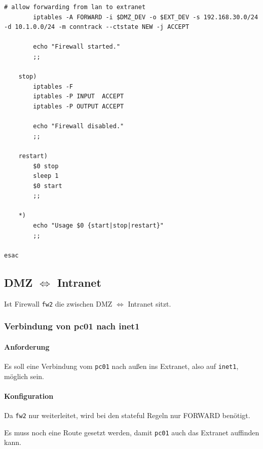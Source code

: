 \begin{lstlisting}[label=lst:masq,caption={Masquerading.}]
        # allow forwarding from lan to extranet
        iptables -A FORWARD -i $DMZ_DEV -o $EXT_DEV -s 192.168.30.0/24 -d 10.1.0.0/24 -m conntrack --ctstate NEW -j ACCEPT

        echo "Firewall started."
        ;;

    stop)
        iptables -F
        iptables -P INPUT  ACCEPT
        iptables -P OUTPUT ACCEPT

        echo "Firewall disabled."
        ;;

    restart)
        $0 stop
        sleep 1
        $0 start
        ;;

    *)
        echo "Usage $0 {start|stop|restart}"
        ;;

esac
\end{lstlisting}


\subsection{DMZ $\Longleftrightarrow$ Intranet}

Ist Firewall {\tt fw2} die zwischen DMZ $\Longleftrightarrow$ Intranet sitzt.

\subsubsection{Verbindung von pc01 nach inet1}

\paragraph{Anforderung} Es soll eine Verbindung vom {\tt pc01} nach
außen ins Extranet, also auf {\tt inet1}, möglich sein.


\paragraph{Konfiguration}

Da {\tt fw2} nur weiterleitet, wird bei den stateful
Regeln nur FORWARD benötigt.

Es muss noch eine Route gesetzt werden, damit {\tt pc01} auch das Extranet
auffinden kann.

